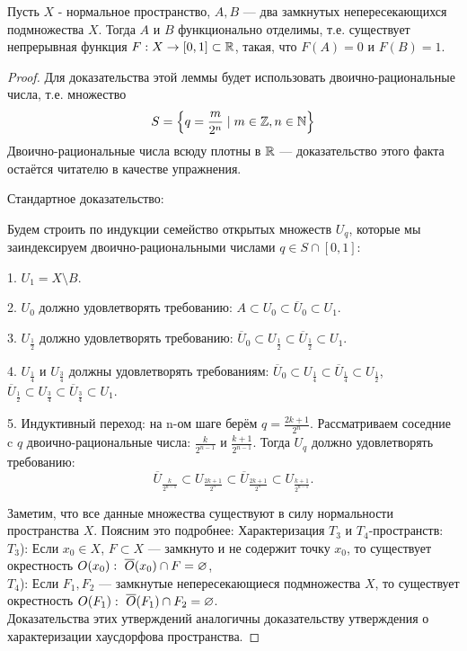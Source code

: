 \begin{theorem}
    Пусть $X$ - нормальное пространство, $A, B$ --- два замкнутых непересекающихся подмножества $X$. Тогда $A$ и $B$ функционально отделимы, т.е. существует непрерывная функция $F: X \rightarrow [0, 1] \subset \mathbb{R}$, такая, что $F(A) = 0$ и $F(B) = 1$.
\end{theorem}
\begin{proof}
    Для доказательства этой леммы будет использовать двоично-рациональные числа, т.е. множество
    \[
        S = \left\{q = \frac{m}{2^n} \mid m \in \mathbb{Z}, n \in \mathbb{N}\right\}
    \]
    Двоично-рациональные числа всюду плотны в $\mathbb{R}$ --- доказательство этого факта остаётся читателю в качестве упражнения.

    Стандартное доказательство: 
        
        Будем строить по индукции семейство открытых множеств $U_{q}$, которые мы заиндексируем двоично-рациональными числами $q \in S \cap [0, 1]$:
        
            1. $U_1 = X \setminus B$.
            
            2. $U_0$ должно удовлетворять требованию: $A \subset U_0 \subset \overline{U}_0 \subset U_1$.

            3. $U_{\frac{1}{2}}$ должно удовлетворять требованию: $\overline{U}_0 \subset U_{\frac{1}{2}} \subset \overline{U}_{\frac{1}{2}} \subset U_1$.

            4. $U_{\frac{1}{4}}$ и $U_{\frac{3}{4}}$ должны удовлетворять требованиям: $\overline{U}_0 \subset U_{\frac{1}{4}} \subset \overline{U}_{\frac{1}{4}} \subset U_{\frac{1}{2}}$, \ \ $\overline{U}_\frac{1}{2} \subset U_{\frac{3}{4}} \subset \overline{U}_{\frac{3}{4}} \subset U_{1}$.

            5. Индуктивный переход: на n-ом шаге берём $q = \frac{2k + 1}{2^n}$. Рассматриваем соседние c $q$ двоично-рациональные числа: $\frac{k}{2^{n - 1}}$ и $\frac{k + 1}{2^{n - 1}}$. Тогда ${U}_{q}$ должно удовлетворять требованию:
            \[
                \overline{U}_{\frac{k}{2^{n - 1}}} \subset U_{\frac{2k + 1}{2^n}} \subset \overline{U}_{\frac{2k + 1}{2^n}} \subset U_{\frac{k + 1}{2^{n - 1}}}.
            \]

            Заметим, что все данные множества существуют в силу нормальности пространства $X$. Поясним это подробнее:
            Характеризация $T_3$ и $T_4$-пространств: \\
            $T_3$): Если $x_0 \in X$, $F \subset X$ --- замкнуто и не содержит точку $x_0$, то существует окрестность $O(x_0): \ \overline{O}(x_0) \cap F = \es$, \\
            $T_4$): Если $F_1, F_2$ --- замкнутые непересекающиеся подмножества $X$, то существует окрестность $O(F_1): \ \overline{O}(F_1) \cap F_2 = \es$. \\
            Доказательства этих утверждений аналогичны доказательству утверждения о характеризации хаусдорфова пространства.


\end{proof}

